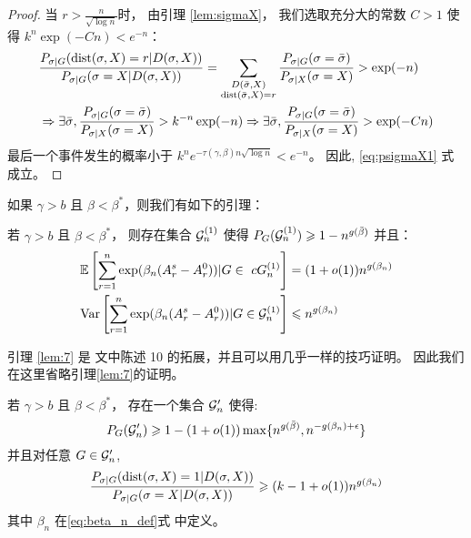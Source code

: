 \begin{proof}
  当 $r>\frac{n}{\sqrt{\log n}}$时，
  由引理 \ref{lem:sigmaX}，
  我们选取充分大的常数  $C>1$
  使得 $k^n\exp(-Cn) < e^{-n}$：
  \begin{align*}
  &\frac{P_{\sigma|G}(\operatorname{dist}(\sigma, X)=r | D(\sigma, X))}
  {P_{\sigma|G}(\sigma=X | D(\sigma, X))} = 
  \sum_{\substack{D(\bar{\sigma}, X) \\ 
  \operatorname{dist}(\bar{\sigma}, X)=r}} \frac{P_{\sigma | G}(\sigma = \bar{\sigma}) }{P_{\sigma | X}(\sigma = X)} > \exp(-n)\\
  &\Rightarrow \exists \bar{\sigma},
  \frac{P_{\sigma | G}(\sigma = \bar{\sigma}) }{P_{\sigma | X}(\sigma = X)} > k^{-n}\exp(-n)
  \Rightarrow \exists \bar{\sigma},
  \frac{P_{\sigma | G}(\sigma = \bar{\sigma}) }{P_{\sigma | X}(\sigma = X)} > \exp(-Cn)\\
  \end{align*}
  最后一个事件发生的概率小于 $k^ne^{-\tau(\gamma, \beta) n\sqrt{\log n}}<e^{-n}$。
  因此,   \eqref{eq:psigmaX1} 式成立。
  \end{proof}

  如果 $\gamma > b$ 且 $\beta < \beta^*$，则我们有如下的引理：
 \begin{lemma}\label{lem:7}
	若 $\gamma > b$ 且 $\beta < \beta^*$，
  则存在集合 $\mathcal{G}^{(1)}_n$ 使得
	$P_G(\mathcal{G}^{(1)}_n) \geqslant 1-n^{g(\bar{\beta})}$
	并且：
 \begin{align}
	\mathbb{E}\left[
    \sum_{r=1}^n \exp(\beta_n (A_r^s - A_r^0)) | G \in \   cG^{(1)}_n\right] &= (1+o(1))n^{g(\beta_n)} \\
	\operatorname{\mathrm{Var}} \left[
    \sum_{r=1}^n \exp(\beta_n (A_r^s - A_r^0)) | G \in \mathcal{G}^{(1)}_n
    \right] &\leqslant n^{g(\beta_n)}
	\end{align}
\end{lemma}
引理 \ref{lem:7} 是 \citet{ye2020exact} 文中陈述 10 
的拓展，并且可以用几乎一样的技巧证明。
因此我们在这里省略引理\ref{lem:7}的证明。

\begin{lemma}\label{prop:large2}
	若 $\gamma > b$ 且 $\beta < \beta^*$，
 存在一个集合 $\mathcal{G}'_n$ 使得:
\begin{equation}
	P_G(\mathcal{G}'_n) \geqslant 1 - (1+o(1))\max\{n^{g(\bar{\beta})}, n^{- g(\beta_n) + \epsilon} \}
	\end{equation}
	并且对任意 $G \in \mathcal{G}'_n$,
\begin{equation}\label{eq:diff1g}
	\frac{P_{\sigma|G}(\operatorname{dist}(\sigma, X)=1 | D(\sigma, X))}
	{P_{\sigma|G}(\sigma=X | D(\sigma, X))} \geqslant (k-1+o(1))n^{g(\beta_n)}
	\end{equation}
  其中 $\beta_n$ 在\eqref{eq:beta_n_def}式 中定义。
\end{lemma}

